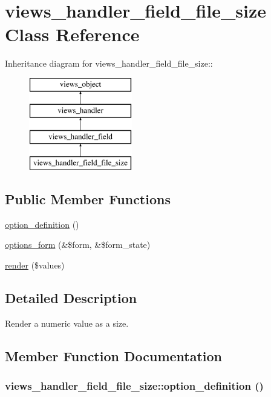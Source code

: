 \hypertarget{classviews__handler__field__file__size}{
\section{views\_\-handler\_\-field\_\-file\_\-size Class Reference}
\label{classviews__handler__field__file__size}
}
Inheritance diagram for views\_\-handler\_\-field\_\-file\_\-size::\begin{figure}[H]
\begin{center}
\leavevmode
\includegraphics[height=4cm]{classviews__handler__field__file__size}
\end{center}
\end{figure}
\subsection*{Public Member Functions}
\begin{CompactItemize}
\item 
\hyperlink{classviews__handler__field__file__size_d89ade5ab0f9d3db4fe71df7588c0f34}{option\_\-definition} ()
\item 
\hyperlink{classviews__handler__field__file__size_b701c7b97e6688971ddfdcd7e9539262}{options\_\-form} (\&\$form, \&\$form\_\-state)
\item 
\hyperlink{classviews__handler__field__file__size_9ceb28e958ee939634f1c91e28b8579c}{render} (\$values)
\end{CompactItemize}


\subsection{Detailed Description}
Render a numeric value as a size. 

\subsection{Member Function Documentation}
\hypertarget{classviews__handler__field__file__size_d89ade5ab0f9d3db4fe71df7588c0f34}{
\subsubsection[{option\_\-definition}]{\setlength{\rightskip}{0pt plus 5cm}views\_\-handler\_\-field\_\-file\_\-size::option\_\-definition ()}}
\label{classviews__handler__field__file__size_d89ade5ab0f9d3db4fe71df7588c0f34}


